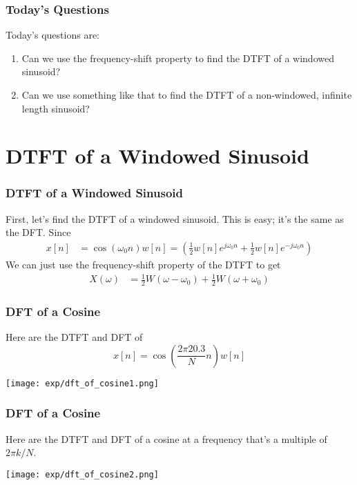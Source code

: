 \documentclass{beamer}
\begin{document}
\begin{frame}
  \frametitle{Today's Questions}

  Today's questions are:
  \begin{enumerate}
  \item Can we use the frequency-shift property to find the DTFT of a
    windowed sinusoid?
  \item Can we use something like that to find the DTFT of a
    non-windowed, infinite length sinusoid?
  \end{enumerate}
\end{frame}

\section[Windowed]{DTFT of a Windowed Sinusoid}
\setcounter{subsection}{1}

\begin{frame}
  \frametitle{DTFT of a Windowed Sinusoid}

  First, let's find the DTFT of a windowed sinusoid.  This is easy;
  it's the same as the DFT.  Since 
  \begin{align*}
    x[n]&=\cos(\omega_0 n)w[n] = 
    \left(\frac{1}{2}w[n]e^{j\omega_0 n}+\frac{1}{2}w[n]e^{-j\omega_0 n}\right)
  \end{align*}
  We can just use the frequency-shift property of the DTFT to get
  \begin{align*}
    X(\omega) &= \frac{1}{2}W\left(\omega-\omega_0\right) +
    \frac{1}{2}W\left(\omega+\omega_0\right)
  \end{align*}
\end{frame}

\begin{frame}
  \frametitle{DFT of a Cosine}

  Here are the DTFT and DFT of
  \[
  x[n] = \cos\left(\frac{2\pi 20.3}{N}n\right) w[n]
  \]
  
  \centerline{\texttt{[image: exp/dft\_of\_cosine1.png]}}
\end{frame}

\begin{frame}
  \frametitle{DFT of a Cosine}

  Here are the DTFT and DFT of a cosine at a frequency that's a multiple of $2\pi k/N$.
  \centerline{\texttt{[image: exp/dft\_of\_cosine2.png]}}
\end{frame}
\end{document}
